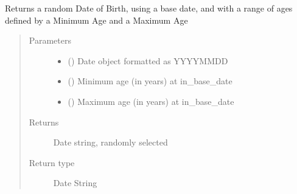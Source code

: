 \documentclass[letterpaper,10pt,english]{sphinxmanual}
\begin{document}

\begin{fulllineitems}
\label{\detokenize{CE_app.synth_phr:CE_app.synth_phr.synth_phr_func.func_nihpo_random_date_birth}}
\sphinxAtStartPar
Returns a random Date of Birth, using a base date, and with a range of ages defined by a Minimum Age and a Maximum Age
\begin{quote}\begin{description}
\item[{Parameters}] \leavevmode\begin{itemize}
\item {} 
\sphinxAtStartPar
{} () \textendash{} Date object formatted as YYYY\sphinxhyphen{}MM\sphinxhyphen{}DD

\item {} 
\sphinxAtStartPar
{} () \textendash{} Minimum age (in years) at in\_base\_date

\item {} 
\sphinxAtStartPar
{} () \textendash{} Maximum age (in years) at in\_base\_date

\end{itemize}

\item[{Returns}] \leavevmode
\sphinxAtStartPar
Date string, randomly selected

\item[{Return type}] \leavevmode
\sphinxAtStartPar
Date String

\end{description}\end{quote}

\end{fulllineitems}

\end{document}
